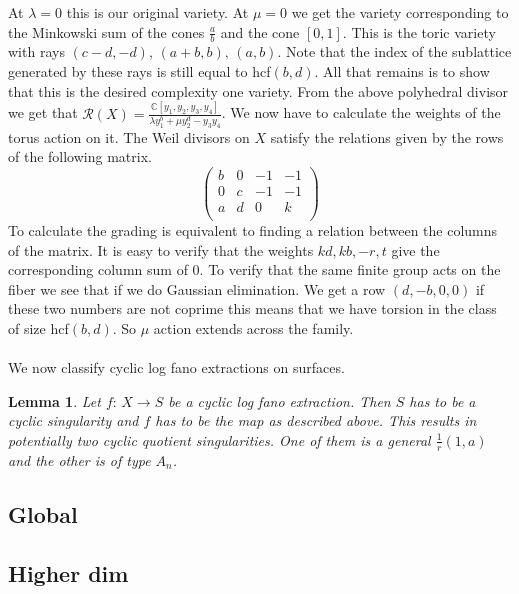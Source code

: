 \documentclass[11pt]{amsart}
\theoremstyle{plain}
\newtheorem{lem}[thm]{Lemma}
\begin{document}
At $\lambda = 0$ this is our original variety. At $\mu = 0$ we get the variety corresponding to the Minkowski sum of the cones $\frac{a}{b}$ and the cone $\left[ 0, 1 \right]$. This is the toric variety with rays $(c-d,-d), \, (a+b, b), \, (a,b)$. Note that the index of the sublattice generated by these rays is still equal to hcf$(b, d)$. All that remains is to show that this is the desired complexity one variety. From the above polyhedral divisor we get that $\mathcal{R}(X) =\frac{\mathbb{C}[y_1, y_2, y_3,  y_4]}{\lambda y_1^b  + \mu y_2^d - y_3 y_4}$. We now have to calculate the weights of the torus action on it. The Weil divisors on $X$ satisfy the relations given by the rows of the following matrix. 
\[
 \left(
 \begin{array}{cccc}
b & 0 & -1 & -1  \\
0 & c & -1 & -1 \\
a & d & 0  & k \\
\end{array}
\right) 
\]
To calculate the grading is equivalent to finding a relation between the columns of the matrix. It is easy to verify that the weights $kd,kb,-r,t$ give the corresponding column sum of 0. To verify that the same finite group acts on the fiber we see that if we do Gaussian elimination. We get a row $(d, -b, 0 ,0)$ if these two numbers are not coprime this means that we have torsion in the class of size hcf$(b,d)$. So $\mathbb{\mu}$ action extends across the family. 
\\
\\
We now classify cyclic log fano extractions on surfaces.
\begin{lem}
Let $f: \, X \rightarrow S$ be a cyclic log fano extraction. Then $S$ has to be a cyclic singularity and $f$ has to be the map as described above. This results in potentially two cyclic quotient singularities. One of them is a general $\frac{1}{r} (1, a)$ and the other is of type $A_n$.
\end{lem}

\subsection{Global}
\subsection{Higher dim}
\end{document}
